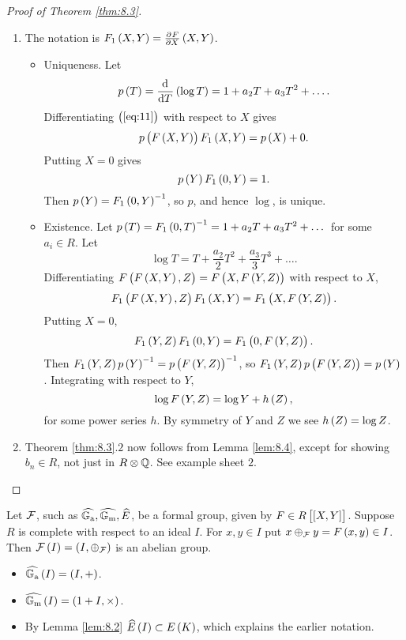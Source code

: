 \begin{proof}[Proof of Theorem \ref{thm:8.3}]
\hfill
\begin{enumerate}
\item The notation is $ F_1\br{X, Y} = \tpd{F}{X}\br{X, Y} $.
\begin{itemize}
\item Uniqueness. Let
$$ p\br{T} = \dod{}{T}\br{\log T} = 1 + a_2T + a_3T^2 + \dots. $$
Differentiating $ \br{\ref{eq:11}} $ with respect to $ X $ gives
$$ p\br{F\br{X, Y}}F_1\br{X, Y} = p\br{X} + 0. $$
Putting $ X = 0 $ gives
$$ p\br{Y}F_1\br{0, Y} = 1. $$
Then $ p\br{Y} = F_1\br{0, Y}^{-1} $, so $ p $, and hence $ \log $, is unique.
\item Existence. Let $ p\br{T} = F_1\br{0, T}^{-1} = 1 + a_2T + a_3T^2 + \dots $ for some $ a_i \in R $. Let
$$ \log T = T + \dfrac{a_2}{2}T^2 + \dfrac{a_3}{3}T^3 + \dots. $$
Differentiating $ F\br{F\br{X, Y}, Z} = F\br{X, F\br{Y, Z}} $ with respect to $ X $,
$$ F_1\br{F\br{X, Y}, Z}F_1\br{X, Y} = F_1\br{X, F\br{Y, Z}}. $$
Putting $ X = 0 $,
$$ F_1\br{Y, Z}F_1\br{0, Y} = F_1\br{0, F\br{Y, Z}}. $$
Then $ F_1\br{Y, Z}p\br{Y}^{-1} = p\br{F\br{Y, Z}}^{-1} $, so $ F_1\br{Y, Z}p\br{F\br{Y, Z}} = p\br{Y} $. Integrating with respect to $ Y $,
$$ \log F\br{Y, Z} = \log Y + h\br{Z}, $$
for some power series $ h $. By symmetry of $ Y $ and $ Z $ we see $ h\br{Z} = \log Z $.
\end{itemize}
\item Theorem \ref{thm:8.3}.$ 2 $ now follows from Lemma \ref{lem:8.4}, except for showing $ b_n \in R $, not just in $ R \otimes \mathbb{Q} $. See example sheet $ 2 $.
\end{enumerate}
\end{proof}

\begin{notation*}
Let $ \mathcal{F} $, such as $ \widehat{\mathbb{G}_{\mathrm{a}}}, \widehat{\mathbb{G}_{\mathrm{m}}}, \widehat{E} $, be a formal group, given by $ F \in R\sbr{\sbr{X, Y}} $. Suppose $ R $ is complete with respect to an ideal $ I $. For $ x, y \in I $ put $ x \oplus_\FFF y = F\br{x, y} \in I $. Then $ \FFF\br{I} = \br{I, \oplus_\FFF} $ is an abelian group.
\end{notation*}

\begin{example*}
\hfill
\begin{itemize}
\item $ \widehat{\GG_\a}\br{I} = \br{I, +} $.
\item $ \widehat{\GG_\m}\br{I} = \br{1 + I, \times} $.
\item By Lemma \ref{lem:8.2} $ \widehat{E}\br{I} \subset E\br{K} $, which explains the earlier notation.
\end{itemize}
\end{example*}

